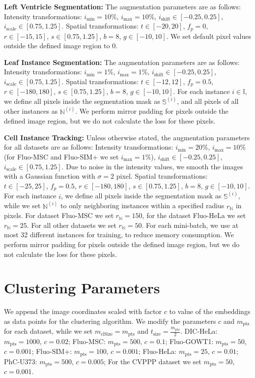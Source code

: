 \documentclass[runningheads,a4paper]{llncs}
\begin{document}
\begin{appendices}
\noindent\textbf{Left Ventricle Segmentation:}
The augmentation parameters are as follows:
Intensity transformations: $i_{\text{min}}=10\%$, $i_{\text{max}}=10\%$, $i_{\text{shift}} \in [-0.25, 0.25]$, $i_{\text{scale}}\in[0.75, 1.25]$.
Spatial transformations: $t\in[-20, 20]$, $f_p=0$, $r\in[-15, 15]$, $s\in[0.75, 1.25]$, $b=8$, $g\in[-10, 10]$.
We set default pixel values outside the defined image region to 0.

\noindent\textbf{Leaf Instance Segmentation:}
The augmentation parameters are as follows:
Intensity transformations: $i_{\text{min}}=1\%$, $i_{\text{max}}=1\%$, $i_{\text{shift}} \in [-0.25, 0.25]$, $i_{\text{scale}}\in[0.75, 1.25]$.
Spatial transformations: $t\in[-12, 12]$, $f_p=0.5$, $r\in[-180, 180]$, $s\in[0.75, 1.25]$, $b=8$, $g\in[-10, 10]$.
For each instance $i\in\mathbb{I}$, we define all pixels inside the segmentation mask as $\mathbb{S}^{(i)}$, and all pixels of all other instances as $\mathbb{N}^{(i)}$.
We perform mirror padding for pixels outside the defined image region, but we do not calculate the loss for these pixels.

\noindent\textbf{Cell Instance Tracking:}
Unless otherwise stated, the augmentation parameters for all datasets are as follows:
Intensity transformations: $i_{\text{min}}=20\%$, $i_{\text{max}}=10\%$ (for Fluo-MSC and Fluo-SIM+ we set $i_{\text{max}}=1\%$), $i_{\text{shift}} \in [-0.25, 0.25]$, $i_{\text{scale}}\in[0.75, 1.25]$.
Due to noise in the intensity values, we smooth the images with a Gaussian function with $\sigma=2$ pixel.
Spatial transformations: $t\in[-25, 25]$, $f_p=0.5$, $r\in[-180, 180]$, $s\in[0.75, 1.25]$, $b=8$, $g\in[-10, 10]$.
For each instance $i$, we define all pixels inside the segmentation mask as $\mathbb{S}^{(i)}$, while we set $\mathbb{N}^{(i)}$ to only neighboring instances within a specified radius $r_{\mathbb{N}}$ in pixels.
For dataset Fluo-MSC we set $r_{\mathbb{N}}=150$, for the dataset Fluo-HeLa we set $r_{\mathbb{N}}=25$. For all other datasets we set $r_{\mathbb{N}}=50$.
For each mini-batch, we use at most 32 different instances for training, to reduce memory consumption.
We perform mirror padding for pixels outside the defined image region, but we do not calculate the loss for these pixels.

\section{Clustering Parameters}

We append the image coordinates scaled with factor $c$ to value of the embeddings as data points for the clustering algorithm.
We modify the parameters $c$ and $m_{\text{pts}}$ for each dataset, while we set $m_{\text{clSize}}=m_{\text{pts}}$ and $t_{\text{size}}=\frac{m_{\text{pts}}}{2}$.
DIC-HeLa: $m_{\text{pts}}=1000$, $c=0.02$;
Fluo-MSC: $m_{\text{pts}}=500$, $c=0.1$;
Fluo-GOWT1: $m_{\text{pts}}=50$, $c=0.001$;
Fluo-SIM+: $m_{\text{pts}}=100$, $c=0.001$;
Fluo-HeLa: $m_{\text{pts}}=25$, $c=0.01$;
PhC-U373: $m_{\text{pts}}=500$, $c=0.005$;
For the CVPPP dataset we set $m_{\text{pts}}=50$, $c=0.001$.


\end{appendices}
\end{document}

